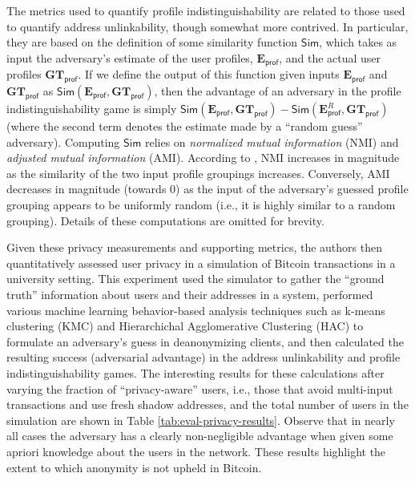 The metrics used to quantify profile indistinguishability are related to those used to quantify address unlinkability, though somewhat more contrived. In particular, they are based on the definition of some similarity function $\mathsf{Sim}$, which takes as input the adversary's estimate of the user profiles, $\mathbf{E}_\mathsf{prof}$, and the actual user profiles $\mathbf{GT}_\mathsf{prof}$. If we define the output of this function given inputs $\mathbf{E}_\mathsf{prof}$ and $\mathbf{GT}_\mathsf{prof}$ as $\mathsf{Sim}(\mathbf{E}_\mathsf{prof}, \mathbf{GT}_\mathsf{prof})$, then the advantage of an adversary in the profile indistinguishability game is simply $\mathsf{Sim}(\mathbf{E}_\mathsf{prof}, \mathbf{GT}_\mathsf{prof}) - \mathsf{Sim}(\mathbf{E}_\mathsf{prof}^R, \mathbf{GT}_\mathsf{prof})$ (where the second term denotes the estimate made by a ``random guess'' adversary). Computing $\mathsf{Sim}$ relies on \emph{normalized mutual information} (NMI) and \emph{adjusted mutual information} (AMI). According to \cite{privacy-19,privacy-20}, NMI increases in magnitude as the similarity of the two input profile groupings increases. Conversely, AMI decreases in magnitude (towards 0) as the input of the adversary's guessed profile grouping appears to be uniformly random (i.e., it is highly similar to a random grouping). Details of these computations are omitted for brevity. 

Given these privacy measurements and supporting metrics, the authors then quantitatively assessed user privacy in a simulation of Bitcoin transactions in a university setting. This experiment used the simulator to gather the ``ground truth'' information about users and their addresses in a system, performed various machine learning behavior-based analysis techniques such as k-means clustering (KMC) and Hierarchichal Agglomerative Clustering (HAC) to formulate an adversary's guess in deanonymizing clients, and then calculated the resulting success (adversarial advantage) in the address unlinkability and profile indistinguishability games. The interesting results for these calculations after varying the fraction of ``privacy-aware'' users, i.e., those that avoid multi-input transactions and use fresh shadow addresses, and the total number of users in the simulation are shown in Table \ref{tab:eval-privacy-results}. Observe that in nearly all cases the adversary has a clearly non-negligible advantage when given some apriori knowledge about the users in the network. These results highlight the extent to which anonymity is not upheld in Bitcoin.

